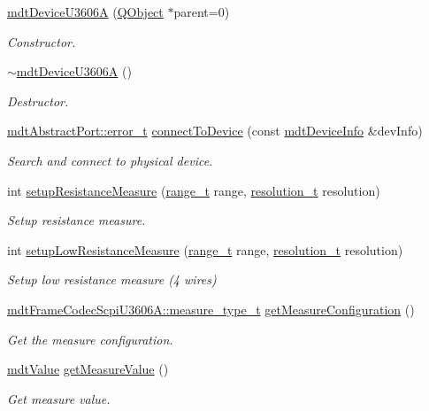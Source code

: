 \begin{DoxyCompactItemize}
\item 
\hyperlink{classmdt_device_u3606_a_a91201ae14df7b553a947b5857eaa1c65}{mdt\-Device\-U3606\-A} (\hyperlink{class_q_object}{Q\-Object} $\ast$parent=0)
\begin{DoxyCompactList}\small\item\em Constructor. \end{DoxyCompactList}\item 
\hyperlink{classmdt_device_u3606_a_a7d2fb26475e72cce95ca6be384d569b7}{$\sim$mdt\-Device\-U3606\-A} ()
\begin{DoxyCompactList}\small\item\em Destructor. \end{DoxyCompactList}\item 
\hyperlink{classmdt_abstract_port_ad4121bb930c95887e77f8bafa065a85e}{mdt\-Abstract\-Port\-::error\-\_\-t} \hyperlink{classmdt_device_u3606_a_acf3b48b13bc179ad4f94b3011b7d607a}{connect\-To\-Device} (const \hyperlink{classmdt_device_info}{mdt\-Device\-Info} \&dev\-Info)
\begin{DoxyCompactList}\small\item\em Search and connect to physical device. \end{DoxyCompactList}\item 
int \hyperlink{classmdt_device_u3606_a_a3ccd18368d0c1a2641e209a471e5753e}{setup\-Resistance\-Measure} (\hyperlink{classmdt_device_u3606_a_ae05c254d19a66c1728d30100f7c600dc}{range\-\_\-t} range, \hyperlink{classmdt_device_u3606_a_a1899206163f2a0163d09cbc482daf806}{resolution\-\_\-t} resolution)
\begin{DoxyCompactList}\small\item\em Setup resistance measure. \end{DoxyCompactList}\item 
int \hyperlink{classmdt_device_u3606_a_a3b5e1eaaae86bebdcc81ddbb95909628}{setup\-Low\-Resistance\-Measure} (\hyperlink{classmdt_device_u3606_a_ae05c254d19a66c1728d30100f7c600dc}{range\-\_\-t} range, \hyperlink{classmdt_device_u3606_a_a1899206163f2a0163d09cbc482daf806}{resolution\-\_\-t} resolution)
\begin{DoxyCompactList}\small\item\em Setup low resistance measure (4 wires) \end{DoxyCompactList}\item 
\hyperlink{classmdt_frame_codec_scpi_u3606_a_a3d7a1de14d77797a08e3d2991fa9f004}{mdt\-Frame\-Codec\-Scpi\-U3606\-A\-::measure\-\_\-type\-\_\-t} \hyperlink{classmdt_device_u3606_a_a8732ec3f4a04a191585191e1ba4f190d}{get\-Measure\-Configuration} ()
\begin{DoxyCompactList}\small\item\em Get the measure configuration. \end{DoxyCompactList}\item 
\hyperlink{classmdt_value}{mdt\-Value} \hyperlink{classmdt_device_u3606_a_ae75a1a896f905487d080761a2b8cf5a5}{get\-Measure\-Value} ()
\begin{DoxyCompactList}\small\item\em Get measure value. \end{DoxyCompactList}\end{DoxyCompactItemize}
